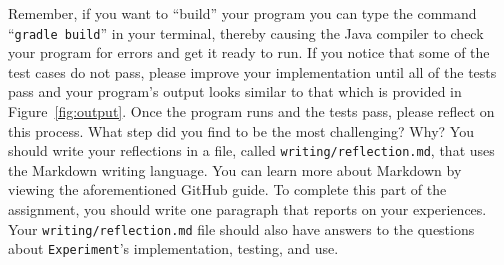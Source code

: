 \documentclass[11pt]{article}
\newcommand{\mainprogram}{\lstinline{Experiment}}
\newcommand{\reflection}{\lstinline{writing/reflection.md}}
\newcommand{\gradlebuild}{\command{gradle build}}
\newcommand{\command}[1]{``\lstinline{#1}''}
\newcommand{\program}[1]{\lstinline{#1}}
\newcommand{\step}[1]{``{#1}''}
\begin{document}



Remember, if you want to \step{build} your program you can type the command
\gradlebuild{} in your terminal, thereby causing the Java compiler to check your
program for errors and get it ready to run. If you notice that some of the test
cases do not pass, please improve your implementation until all of the tests
pass and your program's output looks similar to that which is provided in
Figure~\ref{fig:output}. Once the program runs and the tests pass, please
reflect on this process. What step did you find to be the most challenging? Why?
You should write your reflections in a file, called \reflection{}, that uses the
Markdown writing language. You can learn more about Markdown by viewing the
aforementioned GitHub guide. To complete this part of the assignment, you should
write one paragraph that reports on your experiences. Your \reflection{} file
should also have answers to the questions about \mainprogram{}'s implementation,
testing, and use.
\end{document}
